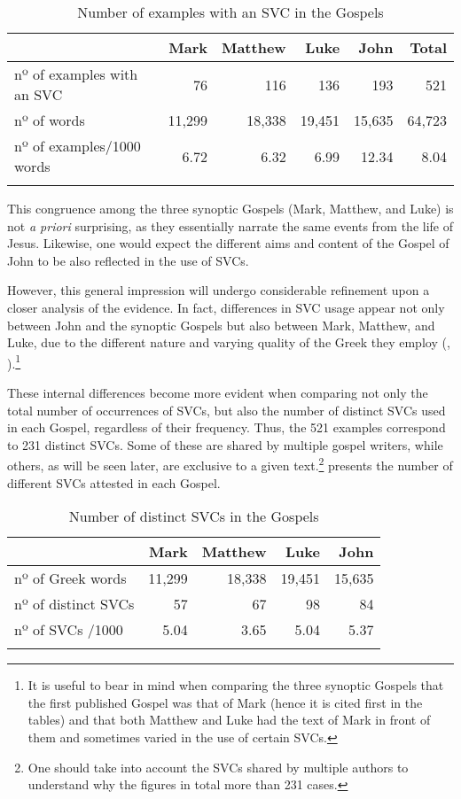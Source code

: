 \documentclass[output=paper,colorlinks,citecolor=brown]{langscibook}
\begin{document}
\begin{table}
  \caption{Number of examples with an SVC in the Gospels}
  \label{tbl:bj:svc}
  \centering
  \small
\begin{tabularx}{\textwidth}{Xrrrrr}
\lsptoprule
 & Mark & Matthew & Luke & John & Total\\
\midrule
nº of examples with an SVC & 76 & 116 & 136 & 193 & 521\\
nº of words & 11,299 & 18,338 & 19,451 & 15,635 & 64,723\\
nº of examples/1000 words & 6.72 & 6.32 & 6.99 & 12.34 & 8.04\\
\lspbottomrule
\end{tabularx}
\end{table}

This congruence among the three synoptic Gospels (Mark, Matthew, and Luke) is not \emph{a
  priori} surprising, as they essentially narrate the same events from the life of Jesus.
Likewise, one would expect the different aims and content of the Gospel of John to be also
reflected in the use of SVCs.

\newpage
However, this general impression will undergo considerable refinement upon a closer
analysis of the evidence. In fact, differences in SVC usage appear not only between John
and the synoptic Gospels but also between Mark, Matthew, and Luke, due to the different
nature and varying quality of the Greek they employ (\cite[vol.
IV]{MHTMoultonTurner1906}, \cite{PorterStanleyE-2014141}).\footnote{It is useful to bear in
  mind when comparing the three synoptic Gospels that the first published Gospel was that
  of Mark (hence it is cited first in the tables) and that both Matthew and Luke had the
  text of Mark in front of them and sometimes varied in the use of certain SVCs.}

These internal differences become more evident when comparing not only the total number of
occurrences of SVCs, but also the number of distinct SVCs used in each Gospel, regardless
of their frequency. Thus, the 521 examples correspond to 231 distinct SVCs. Some of these
are shared by multiple gospel writers, while others, as will be seen later, are exclusive
to a given text.\footnote{One should take into account the SVCs shared by multiple authors
  to understand why the figures in  total more than 231 cases.}
 presents the number of different SVCs attested in each Gospel.

\begin{table}
\caption{Number of distinct SVCs in the Gospels}
\label{tbl:bj:difsvc}
\centering
\begin{tabularx}{.9\textwidth}{Xrrrr}
\lsptoprule
 & Mark & Matthew & Luke & John\\
\midrule
nº of Greek words & 11,299 & 18,338 & 19,451 & 15,635\\
nº of distinct SVCs & 57 & 67 & 98 & 84\\
nº of SVCs /1000 & 5.04 & 3.65 & 5.04 & 5.37\\
\lspbottomrule
\end{tabularx}
\end{table}
\end{document}
